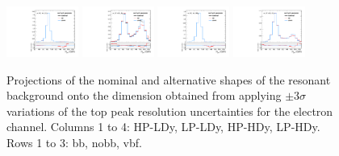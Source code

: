 \begin{figure}[htbp]
  \includegraphics[width=0.21\textwidth]{fig/uncertainties/systs_res_e_HP_vbf_LDy_resTopY_ProjY.pdf}
  \includegraphics[width=0.21\textwidth]{fig/uncertainties/systs_res_e_LP_vbf_LDy_resTopY_ProjY.pdf}
  \includegraphics[width=0.21\textwidth]{fig/uncertainties/systs_res_e_HP_vbf_HDy_resTopY_ProjY.pdf}
  \includegraphics[width=0.21\textwidth]{fig/uncertainties/systs_res_e_LP_vbf_HDy_resTopY_ProjY.pdf}\\
  \caption{
    Projections of the nominal and alternative shapes of the resonant background onto the \MJ dimension obtained from applying $\pm3\sigma$ variations of the top peak resolution uncertainties for the electron channel.
    Columns 1 to 4: HP-LDy, LP-LDy, HP-HDy, LP-HDy.
    Rows 1 to 3: bb, nobb, vbf.
  }
  \label{fig:systResMJ_resTopY}
\end{figure}


